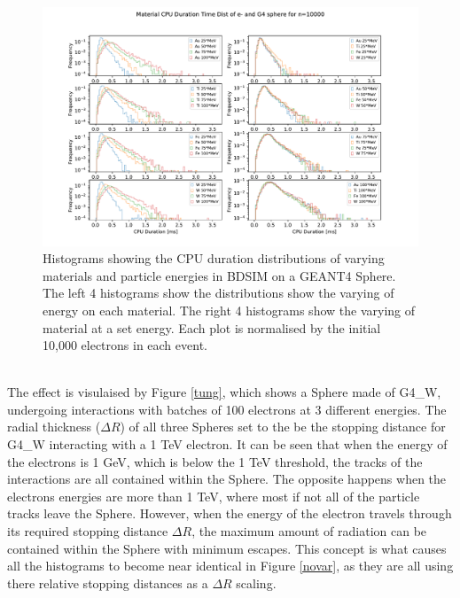 \documentclass[12pt,a4paper]{article}
\begin{document}
\begin{figure}[h!]
\centering
\includegraphics[scale=0.6]{Images//Materials//Varied_by_radius_and_secondaries.pdf}
\caption[width=\columnwidth]{Histograms showing the CPU duration distributions of varying materials and particle energies in BDSIM on a GEANT4 Sphere. The left 4 histograms show the distributions show the varying of energy on each material. The right 4 histograms show the varying of material at a set energy. Each plot is normalised by the initial 10,000 electrons in each event.}
\label{var}
\end{figure}
\\
\noindent The effect is visulaised by Figure \ref{tung}, which shows a Sphere made of G4\_W, undergoing interactions with batches of 100 electrons at 3 different energies. The radial thickness ($\Delta R$) of all three Spheres set to the be the stopping distance for G4\_W interacting with a 1 TeV electron. It can be seen that when the energy of the electrons is 1 GeV, which is below the 1 TeV threshold, the tracks of the interactions are all contained within the Sphere. The opposite happens when the electrons energies are more than 1 TeV, where most if not all of the particle tracks leave the Sphere. However, when the energy of the electron travels through its required stopping distance $\Delta R$, the maximum amount of radiation can be contained within the Sphere with minimum escapes. This concept is what causes all the histograms to become near identical in Figure \ref{novar}, as they are all using there relative stopping distances as a $\Delta R$ scaling.
\end{document}
